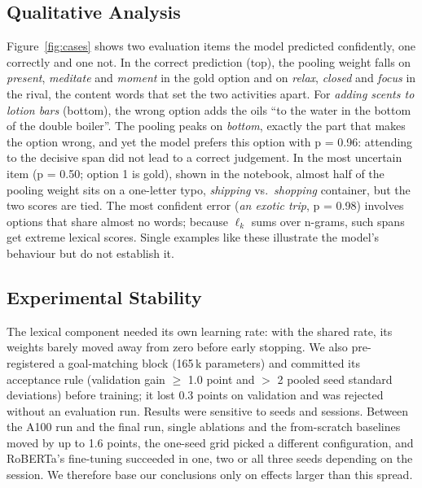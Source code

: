 \documentclass[11pt]{article}
\begin{document}
\subsection{Qualitative Analysis}
Figure~\ref{fig:cases} shows two evaluation items the model predicted confidently, one correctly and one not. In the correct prediction (top), the pooling weight falls on \emph{present}, \emph{meditate} and \emph{moment} in the gold option and on \emph{relax}, \emph{closed} and \emph{focus} in the rival, the content words that set the two activities apart. For \emph{adding scents to lotion bars} (bottom), the wrong option adds the oils ``to the water in the bottom of the double boiler''. The pooling peaks on \emph{bottom}, exactly the part that makes the option wrong, and yet the model prefers this option with p = 0.96: attending to the decisive span did not lead to a correct judgement. In the most uncertain item (p = 0.50; option 1 is gold), shown in the notebook, almost half of the pooling weight sits on a one-letter typo, \emph{shipping} vs.\ \emph{shopping} container, but the two scores are tied. The most confident error (\emph{an exotic trip}, p = 0.98) involves options that share almost no words; because $\ell_k$ sums over n-grams, such spans get extreme lexical scores. Single examples like these illustrate the model's behaviour but do not establish it.

\subsection{Experimental Stability}\label{sec:stability}
The lexical component needed its own learning rate: with the shared rate, its weights barely moved away from zero before early stopping. We also pre-registered a goal-matching block (165\,k parameters) and committed its acceptance rule (validation gain $\geq$ 1.0 point and $>$ 2 pooled seed standard deviations) before training; it lost 0.3 points on validation and was rejected without an evaluation run. Results were sensitive to seeds and sessions. Between the A100 run and the final run, single ablations and the from-scratch baselines moved by up to 1.6 points, the one-seed grid picked a different configuration, and RoBERTa's fine-tuning succeeded in one, two or all three seeds depending on the session. We therefore base our conclusions only on effects larger than this spread.
\end{document}
